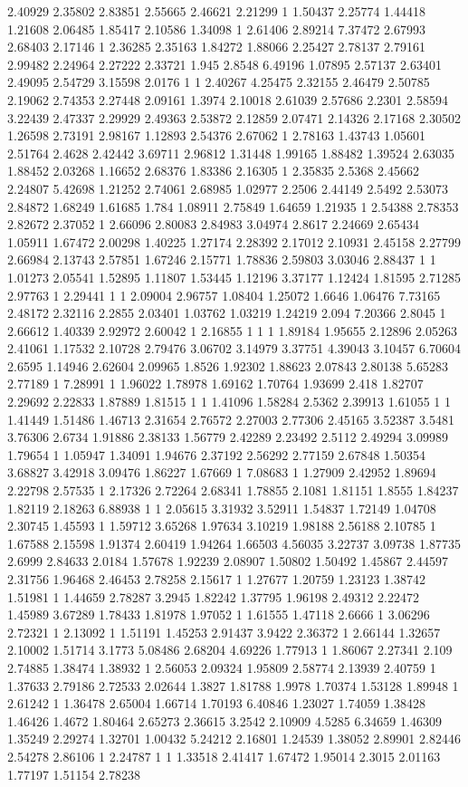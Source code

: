 2.40929 2.35802 2.83851 2.55665 2.46621 2.21299 1 1.50437 2.25774 1.44418 1.21608 2.06485 1.85417 2.10586 1.34098 1 2.61406 2.89214 7.37472 2.67993 2.68403 2.17146 1 2.36285 2.35163 1.84272 1.88066 2.25427 2.78137 2.79161 2.99482 2.24964 2.27222 2.33721 1.945 2.8548 6.49196 1.07895 2.57137 2.63401 2.49095 2.54729 3.15598 2.0176 1 1 2.40267 4.25475 2.32155 2.46479 2.50785 2.19062 2.74353 2.27448 2.09161 1.3974 2.10018 2.61039 2.57686 2.2301 2.58594 3.22439 2.47337 2.29929 2.49363 2.53872 2.12859 2.07471 2.14326 2.17168 2.30502 1.26598 2.73191 2.98167 1.12893 2.54376 2.67062 1 2.78163 1.43743 1.05601 2.51764 2.4628 2.42442 3.69711 2.96812 1.31448 1.99165 1.88482 1.39524 2.63035 1.88452 2.03268 1.16652 2.68376 1.83386 2.16305 1 2.35835 2.5368 2.45662 2.24807 5.42698 1.21252 2.74061 2.68985 1.02977 2.2506 2.44149 2.5492 2.53073 2.84872 1.68249 1.61685 1.784 1.08911 2.75849 1.64659 1.21935 1 2.54388 2.78353 2.82672 2.37052 1 2.66096 2.80083 2.84983 3.04974 2.8617 2.24669 2.65434 1.05911 1.67472 2.00298 1.40225 1.27174 2.28392 2.17012 2.10931 2.45158 2.27799 2.66984 2.13743 2.57851 1.67246 2.15771 1.78836 2.59803 3.03046 2.88437 1 1 1.01273 2.05541 1.52895 1.11807 1.53445 1.12196 3.37177 1.12424 1.81595 2.71285 2.97763 1 2.29441 1 1 2.09004 2.96757 1.08404 1.25072 1.6646 1.06476 7.73165 2.48172 2.32116 2.2855 2.03401 1.03762 1.03219 1.24219 2.094 7.20366 2.8045 1 2.66612 1.40339 2.92972 2.60042 1 2.16855 1 1 1 1.89184 1.95655 2.12896 2.05263 2.41061 1.17532 2.10728 2.79476 3.06702 3.14979 3.37751 4.39043 3.10457 6.70604 2.6595 1.14946 2.62604 2.09965 1.8526 1.92302 1.88623 2.07843 2.80138 5.65283 2.77189 1 7.28991 1 1.96022 1.78978 1.69162 1.70764 1.93699 2.418 1.82707 2.29692 2.22833 1.87889 1.81515 1 1 1.41096 1.58284 2.5362 2.39913 1.61055 1 1 1.41449 1.51486 1.46713 2.31654 2.76572 2.27003 2.77306 2.45165 3.52387 3.5481 3.76306 2.6734 1.91886 2.38133 1.56779 2.42289 2.23492 2.5112 2.49294 3.09989 1.79654 1 1.05947 1.34091 1.94676 2.37192 2.56292 2.77159 2.67848 1.50354 3.68827 3.42918 3.09476 1.86227 1.67669 1 7.08683 1 1.27909 2.42952 1.89694 2.22798 2.57535 1 2.17326 2.72264 2.68341 1.78855 2.1081 1.81151 1.8555 1.84237 1.82119 2.18263 6.88938 1 1 2.05615 3.31932 3.52911 1.54837 1.72149 1.04708 2.30745 1.45593 1 1.59712 3.65268 1.97634 3.10219 1.98188 2.56188 2.10785 1 1.67588 2.15598 1.91374 2.60419 1.94264 1.66503 4.56035 3.22737 3.09738 1.87735 2.6999 2.84633 2.0184 1.57678 1.92239 2.08907 1.50802 1.50492 1.45867 2.44597 2.31756 1.96468 2.46453 2.78258 2.15617 1 1.27677 1.20759 1.23123 1.38742 1.51981 1 1.44659 2.78287 3.2945 1.82242 1.37795 1.96198 2.49312 2.22472 1.45989 3.67289 1.78433 1.81978 1.97052 1 1.61555 1.47118 2.6666 1 3.06296 2.72321 1 2.13092 1 1.51191 1.45253 2.91437 3.9422 2.36372 1 2.66144 1.32657 2.10002 1.51714 3.1773 5.08486 2.68204 4.69226 1.77913 1 1.86067 2.27341 2.109 2.74885 1.38474 1.38932 1 2.56053 2.09324 1.95809 2.58774 2.13939 2.40759 1 1.37633 2.79186 2.72533 2.02644 1.3827 1.81788 1.9978 1.70374 1.53128 1.89948 1 2.61242 1 1.36478 2.65004 1.66714 1.70193 6.40846 1.23027 1.74059 1.38428 1.46426 1.4672 1.80464 2.65273 2.36615 3.2542 2.10909 4.5285 6.34659 1.46309 1.35249 2.29274 1.32701 1.00432 5.24212 2.16801 1.24539 1.38052 2.89901 2.82446 2.54278 2.86106 1 2.24787 1 1 1.33518 2.41417 1.67472 1.95014 2.3015 2.01163 1.77197 1.51154 2.78238 